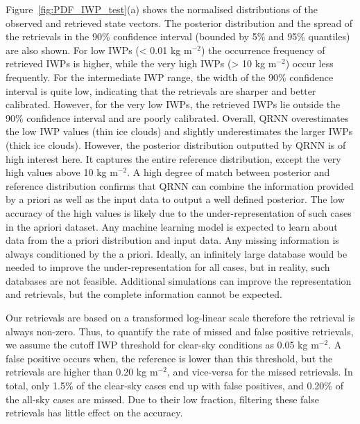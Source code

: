 \documentclass[amt, manuscript]{copernicus}
\begin{document}
Figure~\ref{fig:PDF_IWP_test}(a) shows the normalised distributions of the observed and retrieved state vectors. The posterior distribution and the spread of the retrievals in the 90\% confidence interval (bounded by 5\% and 95\% quantiles) are also shown. For low IWPs (< 0.01\,\,kg m$^{-2}$) the occurrence frequency of retrieved IWPs is higher, while the very high IWPs (> 10\,\,kg m$^{-2}$) occur less frequently. For the intermediate IWP range, the width of the 90\% confidence interval is quite low, indicating that the retrievals are  sharper and better calibrated. However, for the very low IWPs, the retrieved IWPs lie outside the 90\% confidence interval and are poorly calibrated. Overall, QRNN overestimates the low IWP values (thin ice clouds) and  slightly underestimates the larger IWPs (thick ice clouds).
However, the posterior distribution outputted by QRNN is of high interest here. It captures the entire reference distribution, except the very high values above 10\,\,kg m$^{-2}$. A high degree of match between posterior and reference distribution confirms that QRNN can combine the information provided by a priori as well as the input data to output a well defined posterior. The low accuracy of the high values is likely due to the under-representation of such cases in the apriori dataset. Any machine learning model is expected to learn about data from the a priori distribution and input data. Any missing information is always conditioned by the a priori. Ideally, an infinitely large database would be needed to improve the under-representation for all cases, but in reality, such databases are not feasible. Additional simulations can improve the representation and retrievals, but the complete information cannot be expected. 


Our retrievals are based on a transformed log-linear scale therefore the retrieval is always non-zero. Thus, to quantify the rate of missed  and false positive retrievals, we assume the cutoff IWP threshold for clear-sky conditions as 0.05\,\,kg m$^{-2}$. A false positive occurs when, the reference is lower than this threshold, but the retrievals are higher than 0.20\,\,kg m$^{-2}$, and vice-versa for the missed retrievals. In total, only 1.5\% of the clear-sky cases end up with false positives, and 0.20\% of the all-sky cases are missed. Due to their low fraction, filtering these false retrievals has little effect on the accuracy.
\end{document}
